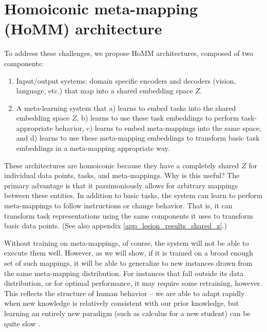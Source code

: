 \documentclass{article}
\begin{document}
\section{Homoiconic meta-mapping (HoMM) architecture}
\vspace{-0.5em} %
To address these challenges, we propose HoMM architectures, composed of two components: 
\vspace{-0.5em}
\begin{enumerate} \setlength \itemsep{0em}
\item Input/output systems: domain specific encoders and decoders (vision, language, etc.) that map into a shared embedding space $Z$.
\item A meta-learning system that a) learns to embed tasks into the shared embedding space $Z$, b) learns to use these task embeddings to perform task-appropriate behavior, c) learns to embed meta-mappings into the same space, and d) learns to use these meta-mapping embeddings to transform basic task embeddings in a meta-mapping appropriate way.\end{enumerate}
\vspace{-0.5em}
These architectures are homoiconic because they have a completely shared $Z$ for individual data points, tasks, and meta-mappings. Why is this useful? The primary advantage is that it parsimoniously allows for arbitrary mappings between these entities. In addition to basic tasks, the system can learn to perform meta-mappings to follow instructions or change behavior. That is, it can transform task representations using the same components it uses to transform basic data points. (See also appendix \ref{app_lesion_results_shared_z}.) \par
Without training on meta-mappings, of course, the system will not be able to execute them well. However, as we will show, if it is trained on a broad enough set of such mappings, it will be able to generalize to new instances drawn from the same meta-mapping distribution. For instances that fall outside its data distribution, or for optimal performance, it may require some retraining, however. This reflects the structure of human behavior -- we are able to adapt rapidly when new knowledge is relatively consistent with our prior knowledge, but learning an entirely new paradigm (such as calculus for a new student) can be quite slow \citep[cf.][]{Kumaran2016, Botvinick2019}. \par 
\end{document}
